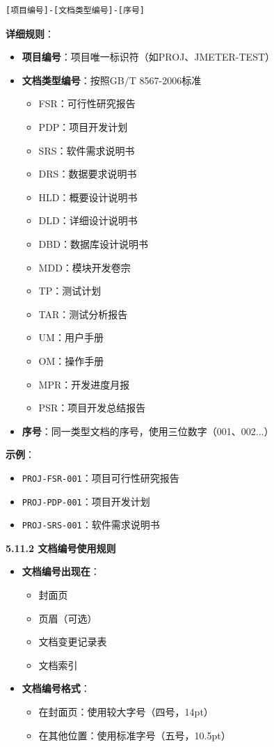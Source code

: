 \documentclass[12pt,a4paper]{article}
\numberwithin{equation}{section}  %
\begin{document}
\begin{verbatim}
[项目编号]-[文档类型编号]-[序号]
\end{verbatim}

\textbf{详细规则}：
\begin{itemize}
\item \textbf{项目编号}：项目唯一标识符（如PROJ、JMETER-TEST）
\item \textbf{文档类型编号}：按照GB/T 8567-2006标准
\begin{itemize}
\item FSR：可行性研究报告
\item PDP：项目开发计划
\item SRS：软件需求说明书
\item DRS：数据要求说明书
\item HLD：概要设计说明书
\item DLD：详细设计说明书
\item DBD：数据库设计说明书
\item MDD：模块开发卷宗
\item TP：测试计划
\item TAR：测试分析报告
\item UM：用户手册
\item OM：操作手册
\item MPR：开发进度月报
\item PSR：项目开发总结报告
\end{itemize}
\item \textbf{序号}：同一类型文档的序号，使用三位数字（001、002...）
\end{itemize}

\textbf{示例}：
\begin{itemize}
\item \texttt{PROJ-FSR-001}：项目可行性研究报告
\item \texttt{PROJ-PDP-001}：项目开发计划
\item \texttt{PROJ-SRS-001}：软件需求说明书
\end{itemize}

\textbf{5.11.2 文档编号使用规则}

\begin{itemize}
\item \textbf{文档编号出现在}：
\begin{itemize}
\item 封面页
\item 页眉（可选）
\item 文档变更记录表
\item 文档索引

\end{itemize}
\item \textbf{文档编号格式}：
\begin{itemize}
\item 在封面页：使用较大字号（四号，14pt）
\item 在其他位置：使用标准字号（五号，10.5pt）
\end{itemize}
\end{itemize}
\end{document}
